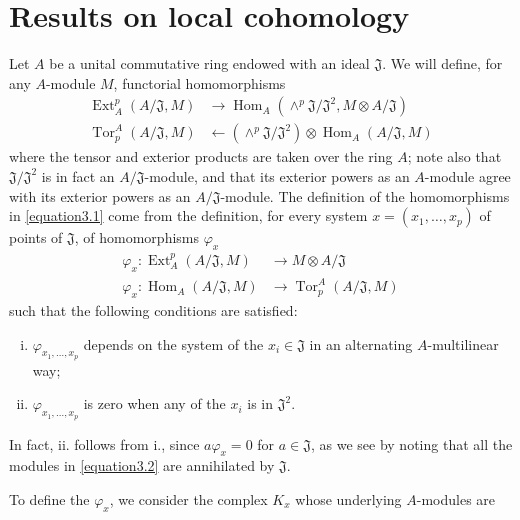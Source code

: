 \documentclass{article}
\theoremstyle{plain}
\newcommand{\from}{\leftarrow}
\DeclareMathOperator{\Ext}{Ext}
\DeclareMathOperator{\Hom}{Hom}
\DeclareMathOperator{\Tor}{Tor}
\newcommand{\oldpage}[1]{\marginpar{\footnotesize$\Big\vert$ \textit{p.~#1}}}
\begin{document}
\section{Results on local cohomology}
\label{section3}

Let $A$ be a unital commutative ring endowed with an ideal $\mathfrak{J}$.
We will define, for any $A$-module $M$, functorial homomorphisms
\[
\label{equation3.1}
  \begin{aligned}
    \Ext_A^p(A/\mathfrak{J},M) &\to \Hom_A(\wedge^p\mathfrak{J}/\mathfrak{J}^2,M\otimes A/\mathfrak{J})
  \\\Tor_p^A(A/\mathfrak{J},M) &\from (\wedge^p\mathfrak{J}/\mathfrak{J}^2)\otimes\Hom_A(A/\mathfrak{J},M)
  \end{aligned}
\tag{3.1}
\]
where the tensor and exterior products are taken over the ring $A$;
note also that $\mathfrak{J}/\mathfrak{J}^2$ is in fact an $A/\mathfrak{J}$-module, and that its exterior powers as an $A$-module agree with its exterior powers as an $A/\mathfrak{J}$-module.
The definition of the homomorphisms in \cref{equation3.1} come from the definition, for every system $x=(x_1,\ldots,x_p)$ of points of $\mathfrak{J}$, of homomorphisms $\varphi_x$
\[
\label{equation3.2}
  \begin{aligned}
    \varphi_x\colon \Ext_A^p(A/\mathfrak{J},M) &\to M\otimes A/\mathfrak{J}
  \\\varphi_x\colon \Hom_A(A/\mathfrak{J},M) &\to \Tor_p^A(A/\mathfrak{J},M)
  \end{aligned}
\tag{3.2}
\]
such that the following conditions are satisfied:
\oldpage{149-06}
\begin{enumerate}[i.]
  \item $\varphi_{x_1,\ldots,x_p}$ depends on the system of the $x_i\in\mathfrak{J}$ in an alternating $A$-multilinear way;
  \item $\varphi_{x_1,\ldots,x_p}$ is zero when any of the $x_i$ is in $\mathfrak{J}^2$.
\end{enumerate}

In fact, ii. follows from i., since $a\varphi_x=0$ for $a\in\mathfrak{J}$, as we see by noting that all the modules in \cref{equation3.2} are annihilated by $\mathfrak{J}$.

To define the $\varphi_x$, we consider the complex $K_x$ whose underlying $A$-modules are



\nocite{*}

\end{document}

